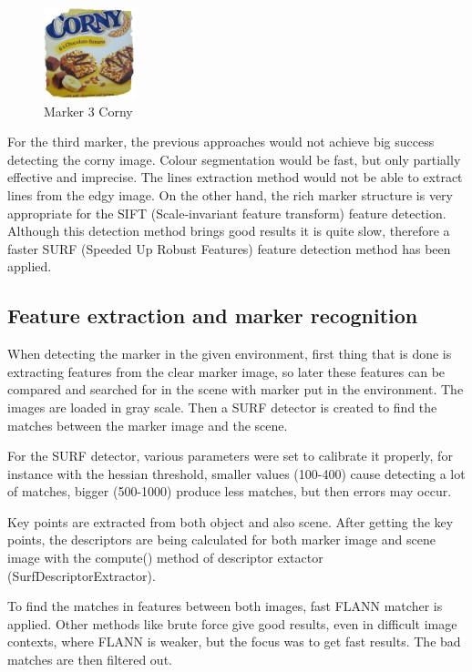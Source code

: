 \begin{figure}[ht!]
	\centering
	\includegraphics[width=100px]{figures/Marker3}
	\caption{Marker 3 Corny}
	\label{fig:markerColor}
\end{figure}

For the third marker, the previous approaches would not achieve big success detecting the corny image. Colour segmentation would be fast, but only partially effective and imprecise. The lines extraction method would not be able to extract lines from the edgy image. On the other hand, the rich marker structure is very appropriate for the SIFT (Scale-invariant feature transform) feature detection. Although this detection method brings good results it is quite slow, therefore a faster SURF (Speeded Up Robust Features) feature detection method has been applied. 

\subsection{Feature extraction and marker recognition}

When detecting the marker in the given environment, first thing that is done is extracting features from the clear marker image, so later these features can be compared and searched for in the scene with marker put in the environment. The images are loaded in gray scale. Then a SURF detector is created to find the matches between the marker image and the scene. 

For the SURF detector, various parameters were set to calibrate it properly, for instance with the hessian threshold, smaller values (100-400) cause detecting a lot of matches, bigger (500-1000) produce less matches, but then errors may occur. 

Key points are extracted from both object and also scene. After getting the key points, the descriptors are being calculated for both marker image and scene image with the compute() method of descriptor extactor (SurfDescriptorExtractor). 

To find the matches in features between both images, fast FLANN matcher is applied. Other methods like brute force give good results, even in difficult image contexts, where FLANN is weaker, but the focus was to get fast results. The bad matches are then filtered out.

